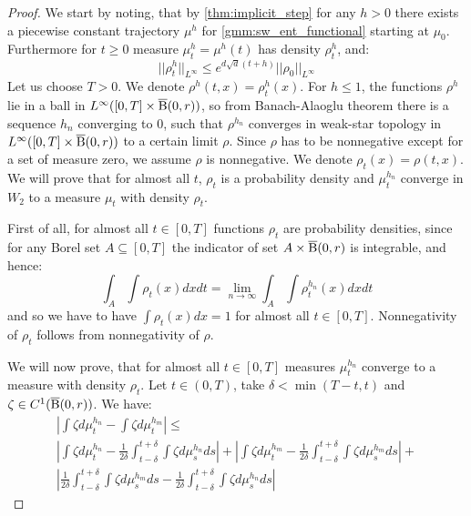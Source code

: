 \begin{proof}
We start by noting, that by \ref{thm:implicit_step} for any $h > 0$ there exists a piecewise constant trajectory $\mu^h$ for \ref{gmm:sw_ent_functional} starting at $\mu_0$. Furthermore for $t \geq 0$ measure $\mu_t^h = \mu^h(t)$ has density $\rho_t^h$, and:
\begin{equation} \label{ineq:dens_bound}
||\rho_t^h||_{L^{\infty}} \leq e^{d \sqrt{d} (t+ h)} ||\rho_0||_{L^{\infty}}
\end{equation}
Let us choose $T > 0$. We denote $\rho^h(t,x) = \rho_t^h(x)$. 
For $ h \leq 1$, the functions $\rho^h$ lie in a ball in $L^{\infty}([0,T] \times \operatorname{\overline{B}}(0,r))$, so from Banach-Alaoglu theorem there is a sequence $h_n$ converging to $0$, such that $\rho^{h_n}$ converges in weak-star topology in $L^{\infty}([0,T] \times \operatorname{\overline{B}}(0,r))$ to a certain limit $\rho$. Since $\rho$ has to be nonnegative except for a set of measure zero, we assume $\rho$ is nonnegative. We denote $\rho_t(x) = \rho(t,x)$. We will prove that for almost all $t$, $\rho_t$ is a probability density and $\mu_{t}^{h_n}$ converge in $W_2$ to a measure $\mu_t$ with density $\rho_t$.

First of all, for almost all $t \in [0,T]$ functions $\rho_t$ are probability densities, since for any Borel set $A \subseteq [0,T]$ the indicator of set $A \times \operatorname{\overline{B}}(0,r)$ is integrable, and hence:
\[
\int_A \int \rho_t(x) dx dt = \lim_{n \rightarrow \infty} \int_A \int \rho_t^{h_n}(x) dx dt
\]
and so we have to have $\int \rho_t(x) dx = 1$ for almost all $t \in [0,T]$. Nonnegativity of $\rho_t$ follows from nonnegativity of $\rho$. 

We will now prove, that for almost all $t \in [0,T]$  measures $\mu_t^{h_n}$ converge to a measure with density $\rho_t$. Let $t \in (0,T)$, take $\delta < \min(T-t, t)$ and $\zeta \in C^1(\operatorname{\overline{B}}(0,r))$. We have:
\begin{multline} \label{ineq:mu_t_conv_bound}
\left| \int \zeta d\mu_t^{h_n} - \int \zeta d\mu_t^{h_m} \right| \leq \\ \left| \int \zeta d\mu_t^{h_n} - \frac{1}{2\delta} \int_{t - \delta}^{t + \delta} \int \zeta d\mu_s^{h_n} ds \right| + 
\left| \int \zeta d\mu_t^{h_m} - \frac{1}{2\delta} \int_{t - \delta}^{t + \delta} \int \zeta d\mu_s^{h_m} ds \right| +  \\
\left| \frac{1}{2\delta} \int_{t - \delta}^{t + \delta} \int \zeta d\mu_s^{h_m} ds - \frac{1}{2\delta} \int_{t - \delta}^{t + \delta} \int \zeta d\mu_s^{h_n} ds \right|
\end{multline}


\end{proof}
